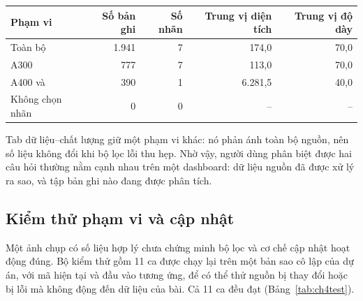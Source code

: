 \begin{center}\begin{minipage}{\linewidth}
\label{tab:ch4kpi}
\small{}
\begin{tabularx}{\linewidth}{@{}Y r r r r@{}}
\toprule
Phạm vi & Số bản ghi & Số nhãn & Trung vị diện tích & Trung vị độ dày \\
\midrule
Toàn bộ & 1.941 & 7 & 174,0 & 70,0 \\
A300 & 777 & 7 & 113,0 & 70,0 \\
A400 và  & 390 & 1 & 6.281,5 & 40,0 \\
Không chọn nhãn & 0 & 0 & -- & -- \\
\bottomrule
\end{tabularx}
\end{minipage}\end{center}

Tab dữ liệu--chất lượng giữ một phạm vi khác: nó phản ánh toàn bộ nguồn, nên số liệu không đổi khi bộ lọc lỗi thu hẹp. Nhờ vậy, người dùng phân biệt được hai câu hỏi thường nằm cạnh nhau trên một dashboard: dữ liệu nguồn đã được xử lý ra sao, và tập bản ghi nào đang được phân tích.

\subsection{Kiểm thử phạm vi và cập nhật}

Một ảnh chụp có số liệu hợp lý chưa chứng minh bộ lọc và cơ chế cập nhật hoạt động đúng. Bộ kiểm thử gồm 11 ca được chạy lại trên một bản sao cô lập của dự án, với mã hiện tại và đầu vào tương ứng, để có thể thử nguồn bị thay đổi hoặc bị lỗi mà không động đến dữ liệu của bài. Cả 11 ca đều đạt (Bảng~\ref{tab:ch4test}).

